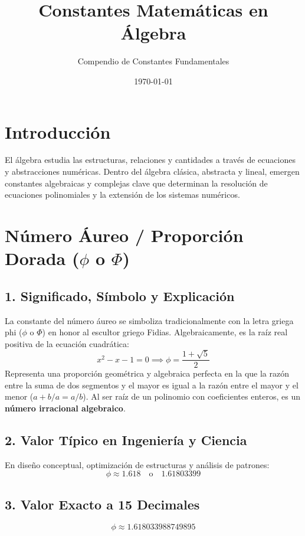 \documentclass[12pt,a4paper]{article}
\title{\textbf{Constantes Matemáticas en Álgebra}}
\author{Compendio de Constantes Fundamentales}
\date{\today}
\begin{document}
\maketitle

\section*{Introducción}
El álgebra estudia las estructuras, relaciones y cantidades a través de ecuaciones y abstracciones numéricas. Dentro del álgebra clásica, abstracta y lineal, emergen constantes algebraicas y complejas clave que determinan la resolución de ecuaciones polinomiales y la extensión de los sistemas numéricos.

\section{Número Áureo / Proporción Dorada ($\phi$ o $\Phi$)}

\subsection*{1. Significado, Símbolo y Explicación}
La constante del número áureo se simboliza tradicionalmente con la letra griega phi ($\phi$ o $\Phi$) en honor al escultor griego Fidias. Algebraicamente, es la raíz real positiva de la ecuación cuadrática:
\begin{equation*}
x^2 - x - 1 = 0 \implies \phi = \frac{1 + \sqrt{5}}{2}
\end{equation*}
Representa una proporción geométrica y algebraica perfecta en la que la razón entre la suma de dos segmentos y el mayor es igual a la razón entre el mayor y el menor ($a+b/a = a/b$). Al ser raíz de un polinomio con coeficientes enteros, es un \textbf{número irracional algebraico}.

\subsection*{2. Valor Típico en Ingeniería y Ciencia}
En diseño conceptual, optimización de estructuras y análisis de patrones:
\begin{equation*}
\phi \approx 1.618 \quad \text{o} \quad 1.61803399
\end{equation*}

\subsection*{3. Valor Exacto a 15 Decimales}
\begin{equation*}
\phi \approx 1.618033988749895
\end{equation*}
\end{document}
